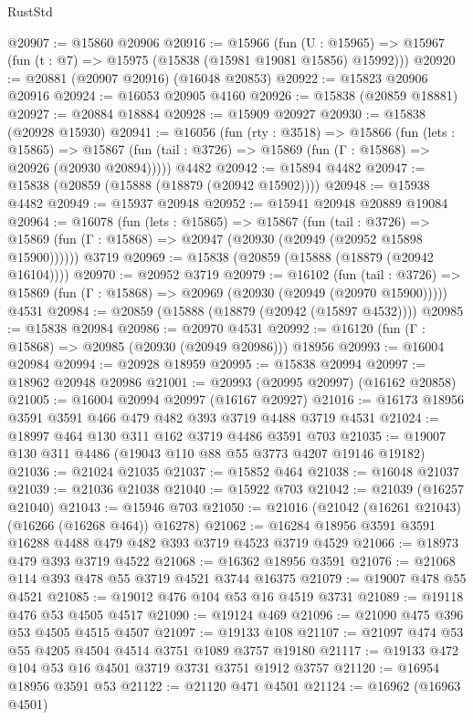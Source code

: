 \begin{lexlean}{RustStd}
\begin{coremodule}
@20907 := @15860 @20906
@20916 := @15966
    (fun (U : @15965) => @15967 (fun (t : @7) => @15975 (@15838 (@15981 @19081 @15856) @15992)))
@20920 := @20881 (@20907 @20916) (@16048 @20853)
@20922 := @15823 @20906 @20916
@20924 := @16053 @20905 @4160
@20926 := @15838 (@20859 @18881)
@20927 := @20884 @18884
@20928 := @15909 @20927
@20930 := @15838 (@20928 @15930)
@20941 := @16056
    (fun (rty : @3518) =>
    @15866
      (fun (lets : @15865) =>
      @15867 (fun (tail : @3726) => @15869 (fun (Γ : @15868) => @20926 (@20930 @20894)))))
    @4482
@20942 := @15894 @4482
@20947 := @15838 (@20859 (@15888 (@18879 (@20942 @15902))))
@20948 := @15938 @4482
@20949 := @15937 @20948
@20952 := @15941 @20948 @20889 @19084
@20964 := @16078
    (fun (lets : @15865) =>
    @15867
      (fun (tail : @3726) =>
      @15869 (fun (Γ : @15868) => @20947 (@20930 (@20949 (@20952 @15898 @15900))))))
    @3719
@20969 := @15838 (@20859 (@15888 (@18879 (@20942 @16104))))
@20970 := @20952 @3719
@20979 := @16102
    (fun (tail : @3726) => @15869 (fun (Γ : @15868) => @20969 (@20930 (@20949 (@20970 @15900)))))
    @4531
@20984 := @20859 (@15888 (@18879 (@20942 (@15897 @4532))))
@20985 := @15838 @20984
@20986 := @20970 @4531
@20992 := @16120 (fun (Γ : @15868) => @20985 (@20930 (@20949 @20986))) @18956
@20993 := @16004 @20984
@20994 := @20928 @18959
@20995 := @15838 @20994
@20997 := @18962 @20948 @20986
@21001 := @20993 (@20995 @20997) (@16162 @20858)
@21005 := @16004 @20994 @20997 (@16167 @20927)
@21016 := @16173 @18956 @3591 @3591 @466 @479 @482 @393 @3719 @4488 @3719 @4531
@21024 := @18997 @464 @130 @311 @162 @3719 @4486 @3591 @703
@21035 := @19007 @130 @311 @4486 (@19043 @110 @88 @55 @3773 @4207 @19146 @19182)
@21036 := @21024 @21035
@21037 := @15852 @464
@21038 := @16048 @21037
@21039 := @21036 @21038
@21040 := @15922 @703
@21042 := @21039 (@16257 @21040)
@21043 := @15946 @703
@21050 := @21016 (@21042 (@16261 @21043) (@16266 (@16268 @464)) @16278)
@21062 := @16284 @18956 @3591 @3591 @16288 @4488 @479 @482 @393 @3719 @4523 @3719 @4529
@21066 := @18973 @479 @393 @3719 @4522
@21068 := @16362 @18956 @3591
@21076 := @21068 @114 @393 @478 @55 @3719 @4521 @3744 @16375
@21079 := @19007 @478 @55 @4521
@21085 := @19012 @476 @104 @53 @16 @4519 @3731
@21089 := @19118 @476 @53 @4505 @4517
@21090 := @19124 @469
@21096 := @21090 @475 @396 @53 @4505 @4515 @4507
@21097 := @19133 @108
@21107 := @21097 @474 @53 @55 @4205 @4504 @4514 @3751 @1089 @3757 @19180
@21117 := @19133 @472 @104 @53 @16 @4501 @3719 @3731 @3751 @1912 @3757
@21120 := @16954 @18956 @3591 @53
@21122 := @21120 @471 @4501
@21124 := @16962 (@16963 @4501)

\end{coremodule}
\end{lexlean}
